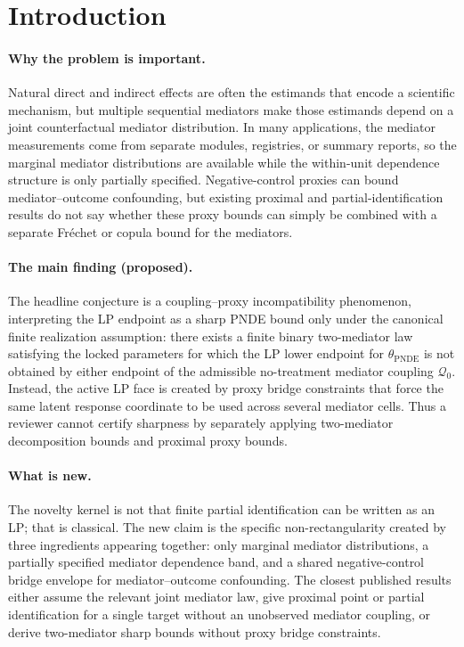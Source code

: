 \documentclass[11pt]{article}
\theoremstyle{definition}
\theoremstyle{plain}
\theoremstyle{remark}
\begin{document}
\section{Introduction}
\paragraph{Why the problem is important.}
Natural direct and indirect effects are often the estimands that encode a
scientific mechanism, but multiple sequential mediators make those estimands
depend on a joint counterfactual mediator distribution.  In many applications,
the mediator measurements come from separate modules, registries, or summary
reports, so the marginal mediator distributions are available while the
within-unit dependence structure is only partially specified.  Negative-control
proxies can bound mediator--outcome confounding, but existing proximal and
partial-identification results do not say whether these proxy bounds can simply
be combined with a separate Fréchet or copula bound for the mediators.

\paragraph{The main finding (proposed).}
The headline conjecture is a coupling--proxy incompatibility phenomenon,
interpreting the LP endpoint as a sharp PNDE bound only under the canonical
finite realization assumption:
there exists a finite binary two-mediator law satisfying the locked parameters
for which the LP lower endpoint for \(\theta_{\mathrm{PNDE}}\) is not obtained
by either endpoint of the admissible no-treatment mediator coupling
\(\mathcal Q_0\).  Instead, the active LP face is created by proxy bridge
constraints that force the same latent response coordinate to be used across
several mediator cells.  Thus a reviewer cannot certify sharpness by separately
applying two-mediator decomposition bounds and proximal proxy bounds.

\paragraph{What is new.}
The novelty kernel is not that finite partial identification can be written as
an LP; that is classical.  The new claim is the specific non-rectangularity
created by three ingredients appearing together: only marginal mediator
distributions, a partially specified mediator dependence band, and a shared
negative-control bridge envelope for mediator--outcome confounding.  The
closest published results either assume the relevant joint mediator law, give
proximal point or partial identification for a single target without an
unobserved mediator coupling, or derive two-mediator sharp bounds without proxy
bridge constraints.
\end{document}
